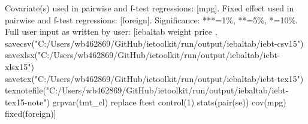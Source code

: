 Covariate(s) used in pairwise and f-test regressions: [mpg]. Fixed effect used in pairwise and f-test regressions: [foreign]. Significance: ***=1\%, **=5\%, *=10\%. Full user input as written by user: [iebaltab weight price , savecsv("C:/Users/wb462869/GitHub/ietoolkit/run/output/iebaltab/iebt-csv15") savexlsx("C:/Users/wb462869/GitHub/ietoolkit/run/output/iebaltab/iebt-xlsx15") savetex("C:/Users/wb462869/GitHub/ietoolkit/run/output/iebaltab/iebt-tex15") texnotefile("C:/Users/wb462869/GitHub/ietoolkit/run/output/iebaltab/iebt-tex15-note") grpvar(tmt\_cl) replace ftest control(1) stats(pair(se)) cov(mpg) fixed(foreign)]

